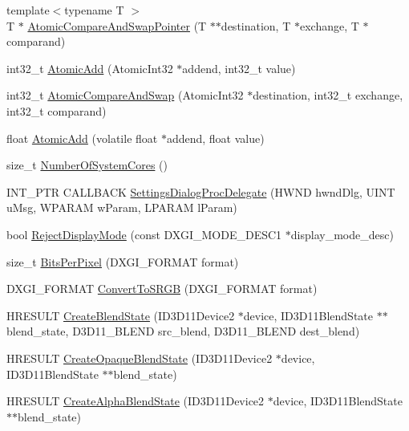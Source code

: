 \begin{DoxyCompactItemize}
{\footnotesize template$<$typename T $>$ }\\T $\ast$ \hyperlink{namespacemage_aed89242e67231f3ddef77bdc63b32b6c}{Atomic\+Compare\+And\+Swap\+Pointer} (T $\ast$$\ast$destination, T $\ast$exchange, T $\ast$comparand)
\item 
int32\+\_\+t \hyperlink{namespacemage_ad397e742fa7e3532686fd46bb50e8166}{Atomic\+Add} (Atomic\+Int32 $\ast$addend, int32\+\_\+t value)
\item 
int32\+\_\+t \hyperlink{namespacemage_a03da57cfa5ba14d4aa0472ae49ec5c7e}{Atomic\+Compare\+And\+Swap} (Atomic\+Int32 $\ast$destination, int32\+\_\+t exchange, int32\+\_\+t comparand)
\item 
float \hyperlink{namespacemage_a0de5ff6241a0474f4572c7c3ba342098}{Atomic\+Add} (volatile float $\ast$addend, float value)
\item 
size\+\_\+t \hyperlink{namespacemage_afe0cda2eaeef24c7e3ee5d7a739b81e4}{Number\+Of\+System\+Cores} ()
\item 
I\+N\+T\+\_\+\+P\+TR C\+A\+L\+L\+B\+A\+CK \hyperlink{namespacemage_a6b352e8d2bf3eeccf1a5dec3f1cf4130}{Settings\+Dialog\+Proc\+Delegate} (H\+W\+ND hwnd\+Dlg, U\+I\+NT u\+Msg, W\+P\+A\+R\+AM w\+Param, L\+P\+A\+R\+AM l\+Param)
\item 
bool \hyperlink{namespacemage_abdccde1f16aa2239019e1b455d8b941b}{Reject\+Display\+Mode} (const D\+X\+G\+I\+\_\+\+M\+O\+D\+E\+\_\+\+D\+E\+S\+C1 $\ast$display\+\_\+mode\+\_\+desc)
\item 
size\+\_\+t \hyperlink{namespacemage_a782fb3970da2fbbc93627f7324c193aa}{Bits\+Per\+Pixel} (D\+X\+G\+I\+\_\+\+F\+O\+R\+M\+AT format)
\item 
D\+X\+G\+I\+\_\+\+F\+O\+R\+M\+AT \hyperlink{namespacemage_a9d84163ab692956f5f4537a965238a09}{Convert\+To\+S\+R\+GB} (D\+X\+G\+I\+\_\+\+F\+O\+R\+M\+AT format)
\item 
H\+R\+E\+S\+U\+LT \hyperlink{namespacemage_ad2c838028ab44521fe1818721dd7ade1}{Create\+Blend\+State} (I\+D3\+D11\+Device2 $\ast$device, I\+D3\+D11\+Blend\+State $\ast$$\ast$blend\+\_\+state, D3\+D11\+\_\+\+B\+L\+E\+ND src\+\_\+blend, D3\+D11\+\_\+\+B\+L\+E\+ND dest\+\_\+blend)
\item 
H\+R\+E\+S\+U\+LT \hyperlink{namespacemage_ab2f30a0ab5f75edd279091ee24bc7811}{Create\+Opaque\+Blend\+State} (I\+D3\+D11\+Device2 $\ast$device, I\+D3\+D11\+Blend\+State $\ast$$\ast$blend\+\_\+state)
\item 
H\+R\+E\+S\+U\+LT \hyperlink{namespacemage_a334c4403848e086f84b328883ff387cc}{Create\+Alpha\+Blend\+State} (I\+D3\+D11\+Device2 $\ast$device, I\+D3\+D11\+Blend\+State $\ast$$\ast$blend\+\_\+state)

\end{DoxyCompactItemize}
